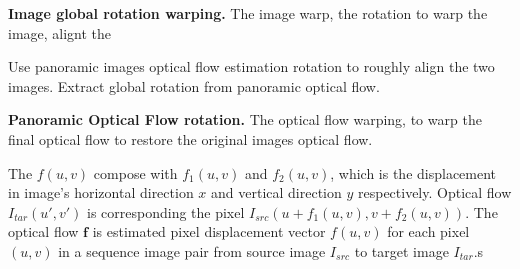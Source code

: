\textbf{Image global rotation warping.}
The image warp, the rotation to warp the image, alignt the 


Use panoramic images optical flow estimation rotation to roughly align the two images.
Extract global rotation from panoramic optical flow.


\textbf{Panoramic Optical Flow rotation.}
The optical flow warping, to warp the final optical flow to restore the original images optical flow.

The $f(u,v)$ compose with $f_1(u,v)$ and $f_2(u,v)$, which is the displacement in image's horizontal direction $x$ and vertical direction $y$ respectively.
Optical flow 
$I_{tar}(u',v')$ is corresponding the pixel $I_{src}(u + f_1(u,v), v + f_2(u,v))$.
The optical flow $\textbf{f}$ is estimated pixel displacement vector $f(u,v)$ for each pixel $(u,v)$ in a sequence image pair from source image $I_{src}$ to target image $I_{tar}$.s


%
